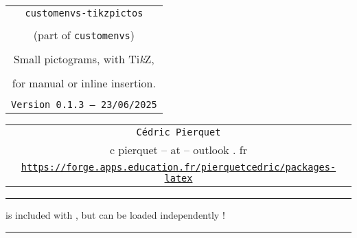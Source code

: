 \documentclass[english,11pt,a4paper]{article}
\def\TPversion{0.1.3}
\def\TPdate{23/06/2025}
\begin{document}
\pagestyle{fancy}

\thispagestyle{empty}

\begin{center}
	\begin{minipage}{0.88\linewidth}
	\begin{tcolorbox}[colframe=yellow,colback=yellow!15]
		\begin{center}
			\begin{tabular}{c}
				{\Huge \texttt{customenvs-tikzpictos}} \\
				\\
				{\LARGE (part of \texttt{customenvs})}\\
				\\
				{\LARGE Small pictograms, with Ti\textit{k}Z,} \\
				\\
				{\LARGE for manual or inline insertion.} \\
				\\
				{\small \texttt{Version \TPversion{} -- \TPdate}}
		\end{tabular}
		\end{center}
	\end{tcolorbox}
\end{minipage}
\end{center}

\begin{center}
	\begin{tabular}{c}
	\texttt{Cédric Pierquet}\\
	{\ttfamily c pierquet -- at -- outlook . fr}\\
	\texttt{\url{https://forge.apps.education.fr/pierquetcedric/packages-latex}}
\end{tabular}
\end{center}

\vspace*{1.25cm}

\hrule

\medskip

\hfill{} is included with , but can be loaded independently !\hfill\null

\medskip

\hrule

\vfill
\end{document}
